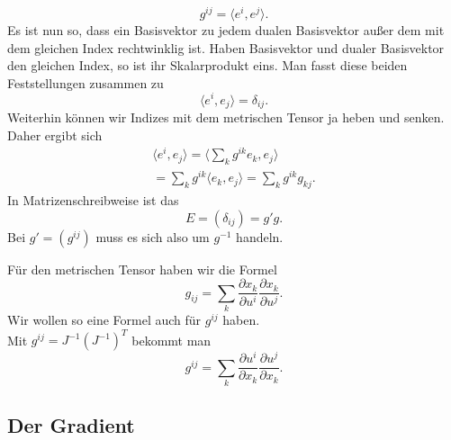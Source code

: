 \documentclass[a4paper,10pt,fleqn,twocolumn,twoside]{article}
\numberwithin{equation}{section}
\begin{document}
\begin{equation}
g^{ij} = \langle e^i, e^j\rangle.
\end{equation}
Es ist nun so, dass ein Basisvektor zu jedem dualen Basisvektor außer
dem mit dem gleichen Index rechtwinklig ist. Haben Basisvektor und
dualer Basisvektor den gleichen Index, so ist ihr Skalarprodukt eins.
Man fasst diese beiden Feststellungen zusammen zu
\begin{equation}
\langle e^i,e_j\rangle = \delta_{ij}.
\end{equation}
%
Weiterhin können wir Indizes mit dem metrischen Tensor ja heben und
senken. Daher ergibt sich
\begin{gather*}\langle e^i,e_j\rangle
= \langle \sum_{k} g^{ik}e_k,e_j\rangle\\
= \sum_{k}g^{ik}\langle e_k,e_j\rangle
= \sum_{k}g^{ik}g_{kj}.
\end{gather*}
In Matrizenschreibweise ist das
\begin{equation}
E = (\delta_{ij}) =  g'g.
\end{equation}
Bei $g'=(g^{ij})$ muss es sich also um $g^{-1}$ handeln.

Für den metrischen Tensor haben wir die Formel
\begin{equation}
g_{ij} = \sum_{k} \frac{\partial x_k}{\partial u^i}
\frac{\partial x_k}{\partial u^j}.
\end{equation}
Wir wollen so eine Formel auch für $g^{ij}$ haben.\\
Mit $g^{ij}=J^{-1}(J^{-1})^T$ bekommt man
\begin{equation}
g^{ij} = \sum_{k} \frac{\partial u^i}{\partial x_k}
\frac{\partial u^j}{\partial x_k}.
\end{equation}

\subsection{Der Gradient}
\end{document}
